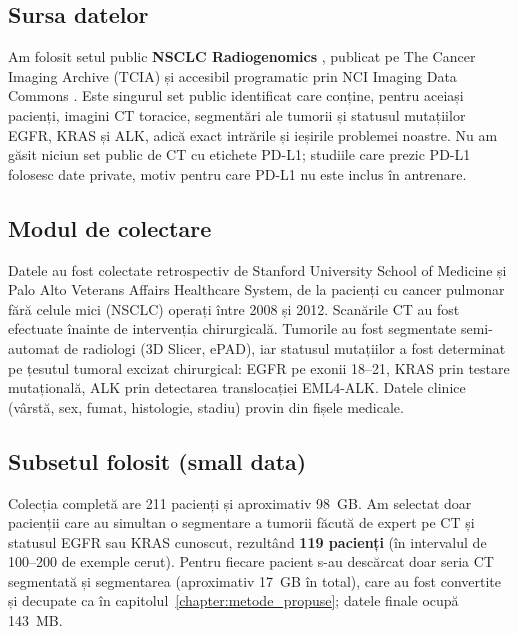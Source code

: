 \documentclass[runningheads,a4paper,11pt]{report}
\begin{document}
\subsection{Sursa datelor}
Am folosit setul public \textbf{NSCLC Radiogenomics} \cite{bakr2018}, publicat pe The Cancer Imaging Archive (TCIA) \cite{tcia} și accesibil programatic prin NCI Imaging Data Commons \cite{idc}. Este singurul set public identificat care conține, pentru aceiași pacienți, imagini CT toracice, segmentări ale tumorii și statusul mutațiilor EGFR, KRAS și ALK, adică exact intrările și ieșirile problemei noastre. Nu am găsit niciun set public de CT cu etichete PD-L1; studiile care prezic PD-L1 folosesc date private, motiv pentru care PD-L1 nu este inclus în antrenare.

\subsection{Modul de colectare}
Datele au fost colectate retrospectiv de Stanford University School of Medicine și Palo Alto Veterans Affairs Healthcare System, de la pacienți cu cancer pulmonar fără celule mici (NSCLC) operați între 2008 și 2012. Scanările CT au fost efectuate înainte de intervenția chirurgicală. Tumorile au fost segmentate semi-automat de radiologi (3D Slicer, ePAD), iar statusul mutațiilor a fost determinat pe țesutul tumoral excizat chirurgical: EGFR pe exonii 18--21, KRAS prin testare mutațională, ALK prin detectarea translocației EML4-ALK. Datele clinice (vârstă, sex, fumat, histologie, stadiu) provin din fișele medicale.

\subsection{Subsetul folosit (small data)}
Colecția completă are 211 pacienți și aproximativ 98~GB. Am selectat doar pacienții care au simultan o segmentare a tumorii făcută de expert pe CT și statusul EGFR sau KRAS cunoscut, rezultând \textbf{119 pacienți} (în intervalul de 100--200 de exemple cerut). Pentru fiecare pacient s-au descărcat doar seria CT segmentată și segmentarea (aproximativ 17~GB în total), care au fost convertite și decupate ca în capitolul~\ref{chapter:metode_propuse}; datele finale ocupă 143~MB.
\end{document}
